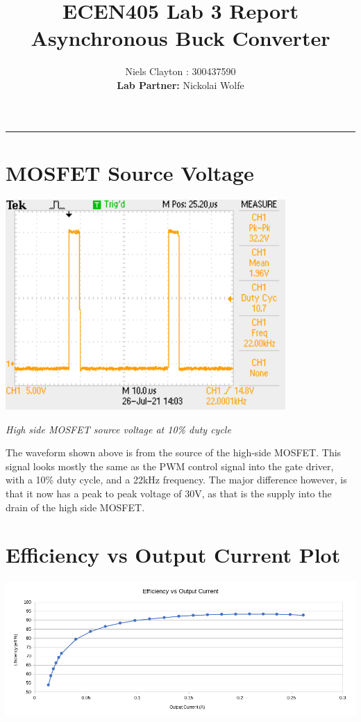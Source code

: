 \documentclass[a4paper,11pt]{article}
\begin{document}
\begin{preview}
\title{\LARGE{\textbf{ECEN405 Lab 3 Report\\Asynchronous Buck Converter}}}
\author{Niels Clayton : 300437590\\\textbf{Lab Partner:} Nickolai Wolfe}
\date{}
\maketitle
\hrule

\section{MOSFET Source Voltage}
  
  \begin{center}
    \includegraphics[width=0.8\textwidth]{continuious_opperation.png}

    \textit{High side MOSFET source voltage at 10\% duty cycle}
  \end{center}

  The waveform shown above is from the source of the high-side MOSFET. This signal looks mostly the same as the PWM control signal into the gate driver, with a 10\% duty cycle, and a 22kHz frequency. The major difference however, is that it now has a peak to peak voltage of 30V, as that is the supply into the drain of the high side MOSFET.
  

\section{Efficiency vs Output Current Plot} 

  \begin{center}
    \includegraphics[width=\textwidth]{sync_buck.png}


\end{center}
\end{preview}
\end{document}
